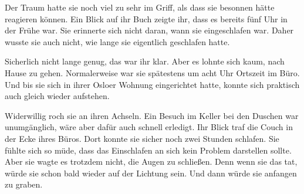 \par

Der Traum hatte sie noch viel zu sehr im Griff, als dass sie besonnen hätte reagieren können. Ein Blick auf ihr Buch zeigte ihr, dass es bereits fünf Uhr in der Frühe war. Sie erinnerte sich nicht daran, wann sie eingeschlafen war. Daher wusste sie auch nicht, wie lange sie eigentlich geschlafen hatte.

\par

Sicherlich nicht lange genug, das war ihr klar. Aber es lohnte sich kaum, nach Hause zu gehen. Normalerweise war sie spätestens um acht Uhr Ortszeit im Büro. Und bis sie sich in ihrer Osloer Wohnung eingerichtet hatte, konnte sich praktisch auch gleich wieder aufstehen.

\par

Widerwillig roch sie an ihren Achseln. Ein Besuch im Keller bei den Duschen war unumgänglich, wäre aber dafür auch schnell erledigt. Ihr Blick traf die Couch in der Ecke ihres Büros. Dort konnte sie sicher noch zwei Stunden schlafen. Sie fühlte sich so müde, dass das Einschlafen an sich kein Problem darstellen sollte. Aber sie wagte es trotzdem nicht, die Augen zu schließen. Denn wenn sie das tat, würde sie schon bald wieder auf der Lichtung sein. Und dann würde sie anfangen zu graben.